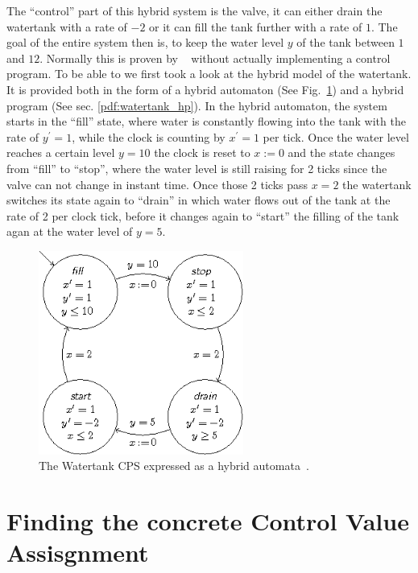 The ``control'' part of this hybrid system is the valve, it can either drain the watertank with a rate of \(-2\) or it can fill the tank further with a rate of \(1\). The goal of the entire system then is, to keep the water level \(y\) of the tank between \(1\) and \(12\). Normally this is proven by \keym~ without actually implementing a control program. To be able to   we first took a look at the hybrid model of the watertank. It is provided both in the form of a hybrid automaton (See Fig.~\ref{fig:watertank_ha}) and a hybrid program (See sec.  \ref{pdf:watertank_hp}). In the hybrid automaton, the system starts in the ``fill'' state, where water is constantly flowing into the tank with the rate of \(y^{\prime} = 1\), while the clock is counting by \(x^{\prime}=1\) per tick. Once the water level reaches a certain level \(y=10\) the clock is reset to \(x:=0\) and the state changes from ``fill'' to ``stop'', where the water level is still raising for 2 ticks since the valve can not change in instant time. Once those 2 ticks pass \(x=2\) the watertank switches its state again to ``drain'' in which water flows out of the tank at the rate of 2 per clock tick, before it changes again to ``start'' the filling of the tank agan at the water level of \(y=5\).

\begin{figure}
	\centering
	\includegraphics[width=0.6\textwidth]{images/watertank_ha}
	\caption{The Watertank CPS expressed as a hybrid automata~\cite{keymaeraGuide}.}
	\label{fig:watertank_ha}
\end{figure}

\label{pdf:watertank_hp}


\section{Finding the concrete Control Value Assisgnment}
\label{sec:Watertank:ControlValue}

